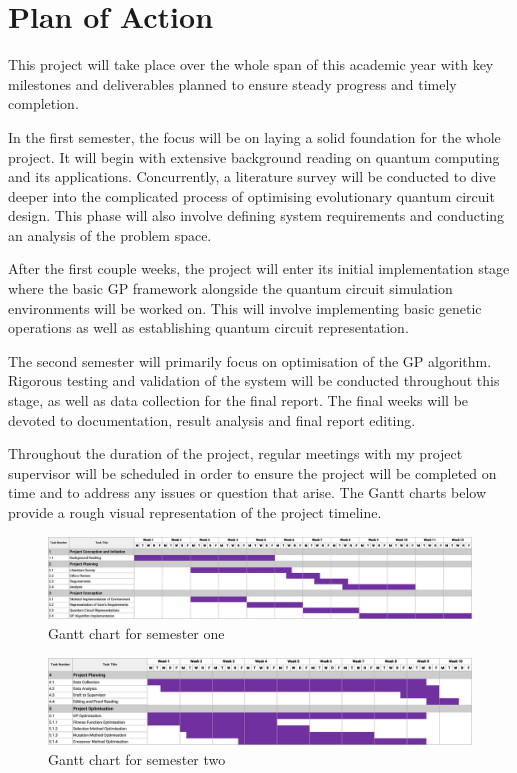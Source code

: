 \chapter{Plan of Action}
This project will take place over the whole span of this academic year with key milestones and deliverables planned to ensure steady progress and timely completion.

In the first semester, the focus will be on laying a solid foundation for the whole project. It will begin with extensive background reading on quantum computing and its applications. Concurrently, a literature survey will be conducted to dive deeper into the complicated process of optimising evolutionary quantum circuit design. This phase will also involve defining system requirements and conducting an analysis of the problem space.

After the first couple weeks, the project will enter its initial implementation stage where the basic GP framework alongside the quantum circuit simulation environments will be worked on. This will involve implementing basic genetic operations as well as establishing quantum circuit representation.

The second semester will primarily focus on optimisation of the GP algorithm. Rigorous testing and validation of the system will be conducted throughout this stage, as well as data collection for the final report. The final weeks will be devoted to documentation, result analysis and final report editing.

Throughout the duration of the project, regular meetings with my project supervisor will be scheduled in order to ensure the project will be completed on time and to address any issues or question that arise. The Gantt charts below provide a rough visual representation of the project timeline.

\begin{figure}[h!]
    \centering
    \includegraphics[width=\textwidth]{images/gantt_1.png}
    \caption{Gantt chart for semester one}
\end{figure}

\begin{figure}[t!]
    \centering
    \includegraphics[width=\textwidth]{images/gantt_2.png}
    \caption{Gantt chart for semester two}
\end{figure}

